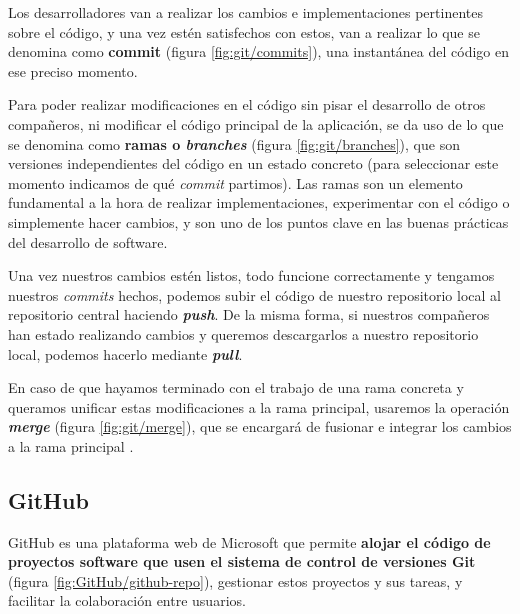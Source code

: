 
Los desarrolladores van a realizar los cambios e implementaciones pertinentes sobre el código, y una vez estén satisfechos con estos, van a realizar lo que se denomina como \textbf{commit} (figura \ref{fig:git/commits}), una instantánea del código en ese preciso momento.


Para poder realizar modificaciones en el código sin pisar el desarrollo de otros compañeros, ni modificar el código principal de la aplicación, se da uso de lo que se denomina como \textbf{ramas o \textit{branches}} (figura \ref{fig:git/branches}), que son versiones independientes del código en un estado concreto (para seleccionar este momento indicamos de qué \textit{commit} partimos). Las ramas son un elemento fundamental a la hora de realizar implementaciones, experimentar con el código o simplemente hacer cambios, y son uno de los puntos clave en las buenas prácticas del desarrollo de software.


Una vez nuestros cambios estén listos, todo funcione correctamente y tengamos nuestros \textit{commits} hechos, podemos subir el código de nuestro repositorio local al repositorio central haciendo \textit{\textbf{push}}. De la misma forma, si nuestros compañeros han estado realizando cambios y queremos descargarlos a nuestro repositorio local, podemos hacerlo mediante \textit{\textbf{pull}}.

En caso de que hayamos terminado con el trabajo de una rama concreta y queramos unificar estas modificaciones a la rama principal, usaremos la operación \textit{\textbf{merge}} (figura \ref{fig:git/merge}), que se encargará de fusionar e integrar los cambios a la rama principal \cite{git:git-basics}.


\subsection{GitHub}

GitHub es una plataforma web de Microsoft que permite \textbf{alojar el código de proyectos software que usen el sistema de control de versiones Git} (figura \ref{fig:GitHub/github-repo}), gestionar estos proyectos y sus tareas, y facilitar la colaboración entre usuarios.

